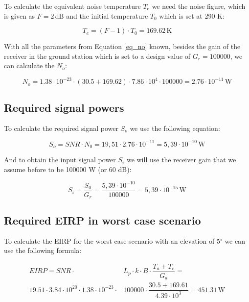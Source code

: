 \documentclass[a4paper,12pt,calibri,oneside,openany]{book}
\newcommand{\unit}[1]{\ensuremath{\, \mathrm{#1}}}
\theoremstyle{break}
\begin{document}
		To calculate the equivalent noise temperature $T_{e}$ we need the noise figure, which is given as $F=2 \unit{dB}$ and the initial temperature $T_{0}$ which is set at 290 K:
		
		\begin{equation} \label{eq_te}
			T_{e} = (F - 1) \cdot T_{0} = 169.62 \unit{K} 
		\end{equation}
	 	
	 	With all the parameters from Equation \ref{eq_no} known, besides the  gain of the receiver in the ground station which is set to a design value of $G_{r}= 100000$, we can calculate the $N_{o}$:
	 	
	 	\begin{equation} \label{eq_no2}
	 		N_{o} = 1.38 \cdot 10^{-23} \cdot \left(30.5 + 169.62 \right) \cdot 7.86 \cdot 10^{4} \cdot 100000 = 2.76 \cdot 10^{-11} \unit{W}
	 	\end{equation}
	 		
	\subsection{Required signal powers}
	
		To calculate the required signal power $S_{o}$ we use the following equation:
	
		\begin{equation} \label{eq_so}
			S_{o} = SNR \cdot N_{0} = 19,51 \cdot 2.76 \cdot 10^{-11} = 5,39 \cdot 10^{-10}  \unit{W}
		\end{equation}
	
		And to obtain the input signal power $S_{i}$ we will use the receiver gain that we assume before to be 100000 W (or 60 dB):
		
		\begin{equation} \label{eq_si}
			S_{i} = \dfrac{S_{0}}{G_{r}}= \dfrac{5,39 \cdot 10^{-10}}{100000} = 5,39 \cdot 10^{-15}  \unit{W}
		\end{equation}		
	
	\subsection{Required EIRP in worst case scenario}
	
		To calculate the EIRP for the worst case scenario with an elevation of 5$^{\circ}$ we can use the following formula:
		
		\begin{equation} \label{eq_eirp}
		\begin{split}
			EIRP = SNR \cdot &L_{p} \cdot k \cdot B \cdot \dfrac{T_{a}+T_{e}}{G_{a}} = \\
			19.51  \cdot 3.84 \cdot 10^{20} \cdot 1.38 \cdot 10^{-23} \cdot &100000 \cdot \dfrac{30.5+169.61}{4.39 \cdot 10^{3}} = 451.31	 \unit{W}
		\end{split}
		\end{equation}
	
\end{document}
